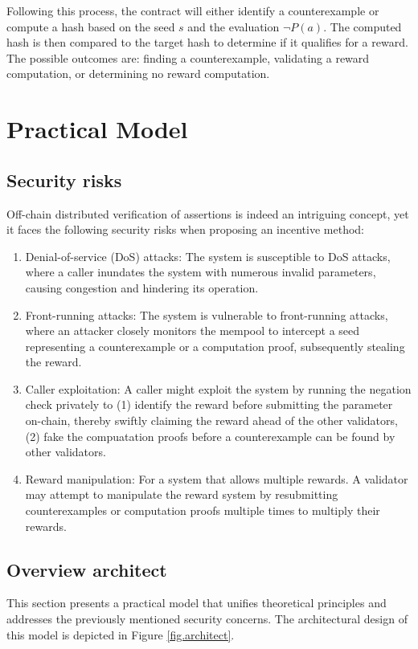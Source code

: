 \documentclass[runningheads]{llncs}
\begin{document}
Following this process, the contract will either identify a counterexample or compute a hash based on the seed \( s \) and the evaluation \( \neg P(a) \). The computed hash is then compared to the target hash to determine if it qualifies for a reward. The possible outcomes are: finding a counterexample, validating a reward computation, or determining no reward computation.
\section{Practical Model}
\label{sec:practical-model}
\subsection{Security risks}
Off-chain distributed verification of assertions is indeed an intriguing concept, yet it faces the following security risks when proposing an incentive method:

\begin{enumerate}
\item Denial-of-service (DoS) attacks: The system is susceptible to DoS attacks, where a caller inundates the system with numerous invalid parameters, causing congestion and hindering its operation.
\item Front-running attacks: The system is vulnerable to front-running attacks, where an attacker closely monitors the mempool to intercept a seed representing a counterexample or a computation proof, subsequently stealing the reward.
\item Caller exploitation: A caller might exploit the system by running the negation check privately to (1) identify the reward before submitting the parameter on-chain, thereby swiftly claiming the reward ahead of the other validators, (2) fake the compuatation proofs before a counterexample can be found by other validators.
\item Reward manipulation: For a system that allows multiple rewards. A validator may attempt to manipulate the reward system by resubmitting counterexamples or computation proofs multiple times to multiply their rewards.
\end{enumerate}
\subsection{Overview architect}
This section presents a practical model that unifies theoretical principles and addresses the previously mentioned security concerns. The architectural design of this model is depicted in Figure \ref{fig.architect}.  
\end{document}
